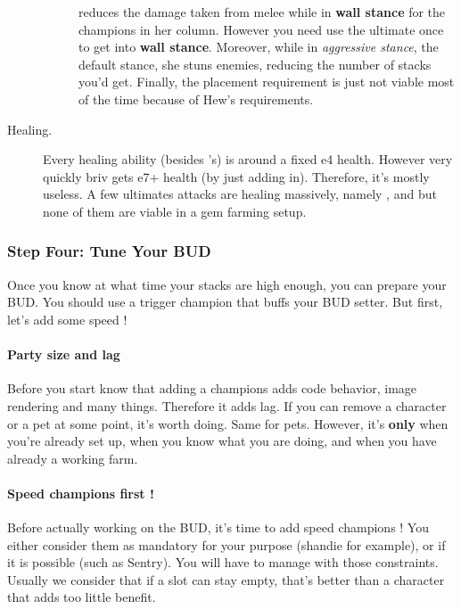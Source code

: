 \documentclass{article}
\begin{document}
\begin{description}
\begin{description}
    \item[\selise] 
    \selise reduces the damage taken from melee while in \textbf{wall stance} for the champions in her column.
    However you need use the ultimate once to get into \textbf{wall stance}.
    Moreover, while in \textit{aggressive stance}, the default stance, she stuns enemies, reducing the number of stacks you'd get.
    Finally, the placement requirement is just not viable most of the time because of Hew's requirements.
    \end{description}
    \item[Healing.]
    Every healing ability (besides \briv's) is around a fixed e4 health.
    However very quickly briv gets e7+ health (by just adding \dragonbait in).
    Therefore, it's mostly useless.
    A few ultimates attacks are healing massively, namely \celeste, \widdle and \walnut but none of them are viable in a gem farming setup.
\end{description}



\subsubsection{Step Four: Tune Your BUD}
\label{sec:stepFour}

Once you know at what time your stacks are high enough, you can prepare your BUD.
You should use a trigger champion that buffs your BUD setter.
But first, let's add some speed !

\paragraph{Party size and lag}

Before you start know that adding a champions adds code behavior, image rendering and many things.
Therefore it adds lag.
If you can remove a character or a pet at some point, it's worth doing.
Same for pets.
However, it's \textbf{only} when you're already set up, when you know what you are doing, and when you have already a working farm.

\paragraph{Speed champions first !}

Before actually working on the BUD, it's time to add speed champions !
You either consider them as mandatory for your purpose (shandie for example), or if it is possible (such as Sentry).
You will have to manage with those constraints.
Usually we consider that if a slot can stay empty, that's better than a character that adds too little benefit.
\end{document}

